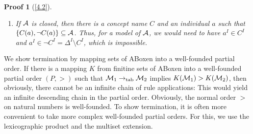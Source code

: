 \documentclass[openany]{scrbook}
\theoremstyle{break}
\theoremstyle{nonumberbreak}
\theoremstyle{nonumberplain}
\theoremstyle{nonumberbreak}
\newtheorem{Proof}{Proof}
\newcommand{\set}[1]{\left\{#1\right\}}
\newcommand{\totab}{\to_{\operatorname{tab}}}
\begin{document}
\begin{Proof}[\cref{4.2}]
\begin{enumerate}
    We claim that $I_{\cal A}$ is a model of ${\cal A}$.
    \begin{itemize}
    \item If $r(x, y) \in {\cal A}$, then $(x^{I_{\cal A}}, y^{I_{\cal
          A}}) = (x, y) \in r^{I_{\cal A}}$ by the definition of $r^{I_{\cal A}}$.
    \item For $C(x) \in {\cal A}$, we show $x^{I_{\cal A}} = x \in
      C^{I_{\cal A}}$ by induction on the structure of $C$.
      \begin{description}
      \item[$C = B \in {\cal N}_C$:] Then $B(x) \in {\cal A}$ implies
        $x \in B^{I_{\cal A}}$ by the definition of $B^{I_{\cal A}}$.
      \item[$C = \neg B \in {\cal N}_C$:] Since ${\cal A}$ is open, we
        have $B(x) \not\in {\cal A}$ and thus $x \not\in B^{I_{\cal
            A}}$ (by definition), which shows $x \in \Delta^{I_{\cal
            A}} \setminus B^{I_{\cal A}} = (\neg B)^{I_{\cal A}}$.
      \item[$C = C_1 \sqcap C_2$:] Since ${\cal A}$ is complete, we
        have $C_1(x) \in {\cal A}$ and $C_2(x) \in {\cal A}$. By
        induction, this yields $x \in C_1^{I_{\cal A}}$ and $x \in
        C_2^{I_{\cal A}}$. Hence, $x \in (C_1 \sqcap C_2)^{I_{\cal
            A}}$.
      \item[$C = \forall r.D$:] Assume that there is a $y \in
        \Delta^{I_{\cal A}}$ such that $(x, y) \in r^{I_{\cal A}}$
        (otherwise, the claim holds trivially). Since $(\forall
        r.D)(x) \in {\cal A}$ and $r(x, y) \in {\cal A}$, completeness
        of ${\cal A}$ implies that $D(y) \in {\cal A}$, and by
        induction, we have $y \in D^{I_{\cal A}}$.
      \end{description}
    \end{itemize}
    The other constructors can be treated similarly.
  \item If ${\cal A}$ is closed, then there is a concept name $C$ and
    an individual $a$ such that $\set{C(a), \neg C(a)} \subseteq {\cal
      A}$. Thus, for a model of ${\cal A}$, we would need to have $a^I
    \in C^I$ and $a^I \in \neg C^I = \Delta^I \setminus C^I$, which is
    impossible.
  \end{enumerate}
\end{Proof}

We show termination by mapping sets of ABoxen into a well-founded
partial order. If there is a mapping $K$ from finitine sets of ABoxen
into a well-founded partial order $(P, >)$ such that ${\cal M}_1
\totab {\cal M}_2$ implies $K({\cal M}_1) > K({\cal M}_2)$, then
obviously, there cannot be an infinite chain of rule applications:
This would yield an infinite descending chain in the partial
order. Obviously, the normal order $>$ on natural numbers is
well-founded. To show termination, it is often more convenient to take
more complex well-founded partial orders. For this, we use the
lexicographic product and the multiset extension.
\end{document}
